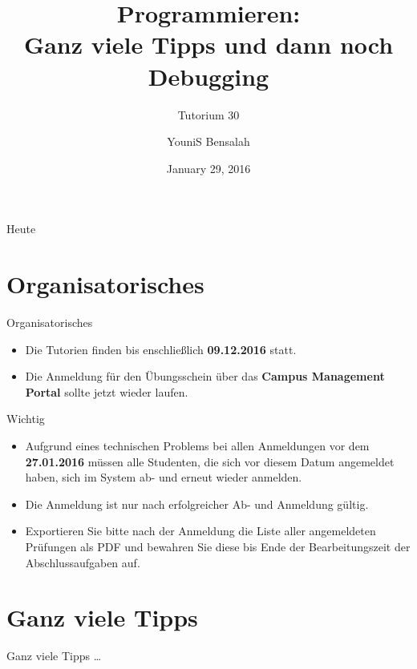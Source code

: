 \documentclass[18pt]{beamer}
\title[Ganz viele Tipps und dann noch Debugging]{Programmieren:\\ Ganz viele Tipps und dann noch Debugging}
\subtitle{Tutorium 30}
\author{YouniS Bensalah}
\date{January 29, 2016}
\institute{Chair for Software Design and Quality}
\begin{document}

\begin{frame}
\titlepage
\end{frame}

\begin{frame}{Heute}
\tableofcontents
\end{frame}

\section{Organisatorisches}

\begin{frame}{Organisatorisches}
    \begin{itemize}
        \item Die Tutorien finden bis enschließlich \textbf{09.12.2016} statt.
        \item Die Anmeldung für den Übungsschein über das \textbf{Campus Management Portal} sollte jetzt wieder laufen.
    \end{itemize}
    \begin{alertblock}{Wichtig}
        \begin{itemize}
            \item Aufgrund eines technischen Problems bei allen Anmeldungen vor dem \textbf{27.01.2016} müssen alle Studenten,
            die sich vor diesem Datum angemeldet haben, sich im System ab- und erneut wieder anmelden.
            \item Die Anmeldung ist nur nach erfolgreicher Ab- und Anmeldung gültig.
            \item Exportieren Sie bitte nach der Anmeldung die Liste aller angemeldeten Prüfungen als PDF
            und bewahren Sie diese bis Ende der Bearbeitungszeit der Abschlussaufgaben auf.
        \end{itemize}
    \end{alertblock}
\end{frame}

\section{Ganz viele Tipps}

\begin{frame}{\quad}
    \center
    \Huge{Ganz viele Tipps \dots}
\end{frame}
\end{document}
